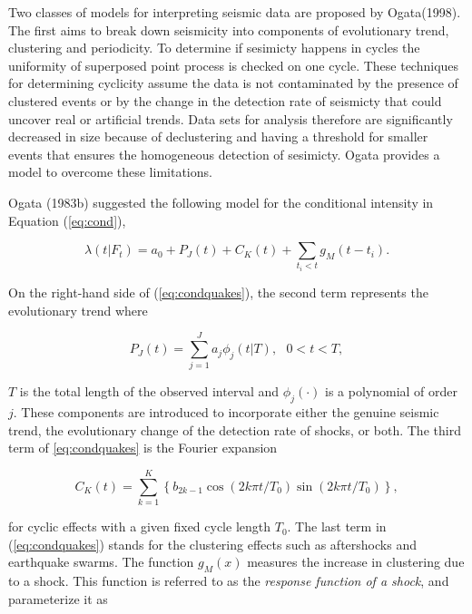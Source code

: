 \documentclass[12pt]{article} %
\theoremstyle{plain}
\begin{document}
	Two classes of models for interpreting seismic data are proposed by Ogata(1998). The first aims to break down seismicity into components of evolutionary trend, clustering and periodicity. To determine if sesimicty happens in cycles the uniformity of superposed point process is checked on one cycle. These techniques for determining cyclicity assume the data is not contaminated by the presence of clustered events or by the change in the detection rate of seismicty that could uncover real or artificial trends. Data sets for analysis therefore are significantly decreased in size because of declustering and having a threshold for smaller events that ensures the homogeneous detection of sesimicty. Ogata provides a model to overcome these limitations. 
	
	Ogata (1983b) suggested the following model for the conditional intensity in Equation (\ref{eq:cond}),

	\begin{equation} \label{eq:condquakes}
		\lambda(t | F_t) = a_0+P_J(t)+C_K(t)+\sum_{t_i<t}g_M(t-t_i).
	\end{equation}
	
	\noindent On the right-hand side of (\ref{eq:condquakes}), the second term represents the evolutionary trend where
	
	\begin{equation} \label{eq:evotrend}
		P_J(t) = \sum_{j=1}^{J} a_j \phi_j(t|T), \ \ \ 0<t<T,
	\end{equation}

	\noindent $T$ is the total length of the observed interval and $\phi_j(\cdot)$ is a polynomial of order $j$. These components are introduced to incorporate either the genuine seismic trend, the evolutionary change of the detection rate of shocks, or both. The third term of \ref{eq:condquakes} is the Fourier expansion 
	
	\begin{equation} \label{eq:fourier}
		C_K(t)= \sum_{k=1}^{K} \left\lbrace b_{2k-1} \cos (2k\pi t/T_0) \sin (2k\pi t/T_0) \right\rbrace ,
	\end{equation}
	
	\noindent for cyclic effects with a given fixed cycle length $T_0$. The last term in (\ref{eq:condquakes}) stands for the clustering effects such as aftershocks and earthquake swarms. The function $g_M(x)$ measures the increase in clustering due to a shock. This function is referred to as the \textit{response function of a shock}, and parameterize it as 
	
\end{document}
